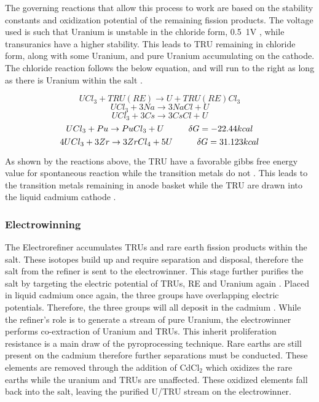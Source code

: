 The governing reactions that allow this process to work are based on the stability constants and oxidization potential of the remaining fission products.
The voltage used is such that Uranium is unstable in the chloride form, 0.5~1V \cite{organisation}, while transuranics have a higher stability. 
This leads to TRU remaining in chloride form, along with some Uranium, and pure Uranium accumulating on the cathode.
The chloride reaction follows the below equation, and will run to the right as long as there is Uranium within the salt \cite{organisation}.

\[ UCl_3+TRU(RE) \rightarrow U + TRU(RE)Cl_3 \]
\[ UCl_3 + 3Na \rightarrow 3NaCl + U \]
\[ UCl_3 + 3Cs \rightarrow 3CsCl + U \]
\[ UCl_3 + Pu \rightarrow PuCl_3 + U \hspace{10mm} \delta G = -22.44kcal \]
\[ 4UCl_3 + 3Zr \rightarrow 3ZrCl_4 + 5U \hspace{10mm} \delta G = 31.123kcal \]

As shown by the reactions above, the TRU have a favorable gibbs free energy value for spontaneous reaction while the transition metals do not \cite{supy}.
This leads to the transition metals remaining in anode basket while the TRU are drawn into the liquid cadmium cathode \cite{lee_korean_2011}.


\subsubsection{Electrowinning}
The Electrorefiner accumulates TRUs and rare earth fission products within the salt.
These isotopes build up and require separation and disposal, therefore the salt from the refiner is sent to the electrowinner.
This stage further purifies the salt by targeting the electric potential of TRUs, RE and Uranium again \cite{lee_korean_2011,organisation}.
Placed in liquid cadmium once again, the three groups have overlapping electric potentials.
Therefore, the three groups will all deposit in the cadmium \cite{lee_korean_2011}. 
While the refiner's role is to generate a stream of pure Uranium, the electrowinner performs co-extraction of Uranium and TRUs.
This inherit proliferation resistance is a main draw of the pyroprocessing technique.
Rare earths are still present on the cadmium therefore further separations must be conducted.
These elements are removed through the addition of CdCl$_2$ which oxidizes the rare earths while the uranium and TRUs are unaffected.
These oxidized elements fall back into the salt, leaving the purified U/TRU stream on the electrowinner.

